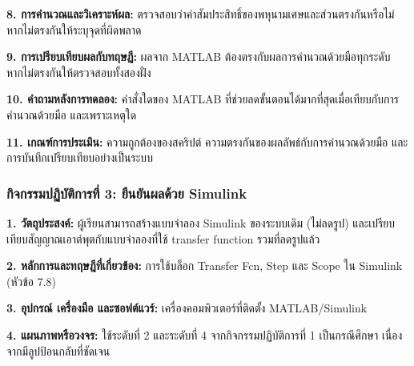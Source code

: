 \textbf{8. การคำนวณและวิเคราะห์ผล:} ตรวจสอบว่าค่าสัมประสิทธิ์ของพหุนามเศษและส่วนตรงกันหรือไม่ หากไม่ตรงกันให้ระบุจุดที่ผิดพลาด

\textbf{9. การเปรียบเทียบผลกับทฤษฎี:} ผลจาก MATLAB ต้องตรงกับผลการคำนวณด้วยมือทุกระดับ หากไม่ตรงกันให้ตรวจสอบทั้งสองฝั่ง

\textbf{10. คำถามหลังการทดลอง:} คำสั่งใดของ MATLAB ที่ช่วยลดขั้นตอนได้มากที่สุดเมื่อเทียบกับการคำนวณด้วยมือ และเพราะเหตุใด

\textbf{11. เกณฑ์การประเมิน:} ความถูกต้องของสคริปต์ ความตรงกันของผลลัพธ์กับการคำนวณด้วยมือ และการบันทึกเปรียบเทียบอย่างเป็นระบบ

\subsubsection{กิจกรรมปฏิบัติการที่ 3: ยืนยันผลด้วย Simulink}

\textbf{1. วัตถุประสงค์:} ผู้เรียนสามารถสร้างแบบจำลอง Simulink ของระบบเดิม (ไม่ลดรูป) และเปรียบเทียบสัญญาณเอาต์พุตกับแบบจำลองที่ใช้ transfer function รวมที่ลดรูปแล้ว

\textbf{2. หลักการและทฤษฎีที่เกี่ยวข้อง:} การใช้บล็อก Transfer Fcn, Step และ Scope ใน Simulink (หัวข้อ 7.8)

\textbf{3. อุปกรณ์ เครื่องมือ และซอฟต์แวร์:} เครื่องคอมพิวเตอร์ที่ติดตั้ง MATLAB/Simulink

\textbf{4. แผนภาพหรือวงจร:} ใช้ระดับที่ 2 และระดับที่ 4 จากกิจกรรมปฏิบัติการที่ 1 เป็นกรณีศึกษา เนื่องจากมีลูปป้อนกลับที่ชัดเจน


